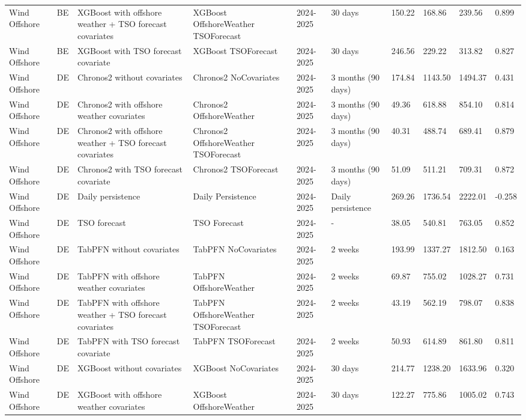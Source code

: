 \begin{longtable}{llllllllll}
Wind Offshore & BE & XGBoost with offshore weather + TSO forecast covariates & XGBoost OffshoreWeather TSOForecast & 2024-2025 & 30 days & 150.22 & 168.86 & 239.56 & 0.899 \\
Wind Offshore & BE & XGBoost with TSO forecast covariate & XGBoost TSOForecast & 2024-2025 & 30 days & 246.56 & 229.22 & 313.82 & 0.827 \\
Wind Offshore & DE & Chronos2 without covariates & Chronos2 NoCovariates & 2024-2025 & 3 months (90 days) & 174.84 & 1143.50 & 1494.37 & 0.431 \\
Wind Offshore & DE & Chronos2 with offshore weather covariates & Chronos2 OffshoreWeather & 2024-2025 & 3 months (90 days) & 49.36 & 618.88 & 854.10 & 0.814 \\
Wind Offshore & DE & Chronos2 with offshore weather + TSO forecast covariates & Chronos2 OffshoreWeather TSOForecast & 2024-2025 & 3 months (90 days) & 40.31 & 488.74 & 689.41 & 0.879 \\
Wind Offshore & DE & Chronos2 with TSO forecast covariate & Chronos2 TSOForecast & 2024-2025 & 3 months (90 days) & 51.09 & 511.21 & 709.31 & 0.872 \\
Wind Offshore & DE & Daily persistence & Daily Persistence & 2024-2025 & Daily persistence & 269.26 & 1736.54 & 2222.01 & -0.258 \\
Wind Offshore & DE & TSO forecast & TSO Forecast & 2024-2025 & - & 38.05 & 540.81 & 763.05 & 0.852 \\
Wind Offshore & DE & TabPFN without covariates & TabPFN NoCovariates & 2024-2025 & 2 weeks & 193.99 & 1337.27 & 1812.50 & 0.163 \\
Wind Offshore & DE & TabPFN with offshore weather covariates & TabPFN OffshoreWeather & 2024-2025 & 2 weeks & 69.87 & 755.02 & 1028.27 & 0.731 \\
Wind Offshore & DE & TabPFN with offshore weather + TSO forecast covariates & TabPFN OffshoreWeather TSOForecast & 2024-2025 & 2 weeks & 43.19 & 562.19 & 798.07 & 0.838 \\
Wind Offshore & DE & TabPFN with TSO forecast covariate & TabPFN TSOForecast & 2024-2025 & 2 weeks & 50.93 & 614.89 & 861.80 & 0.811 \\
Wind Offshore & DE & XGBoost without covariates & XGBoost NoCovariates & 2024-2025 & 30 days & 214.77 & 1238.20 & 1633.96 & 0.320 \\
Wind Offshore & DE & XGBoost with offshore weather covariates & XGBoost OffshoreWeather & 2024-2025 & 30 days & 122.27 & 775.86 & 1005.02 & 0.743 \\

\end{longtable}
